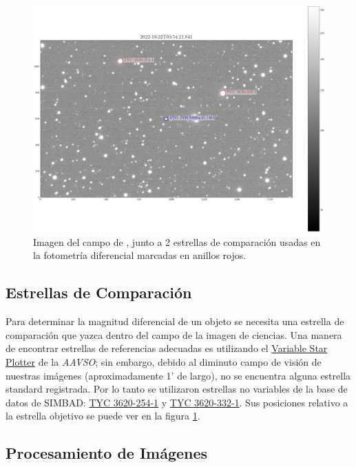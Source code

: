 \begin{figure}[!ht]
	\centering
	\includegraphics[scale=0.4]{Observaciones/Secciones/Figures/10-22 Sample Image.png}
	\caption{Imagen del campo de \atoObjIdNoSpace, junto a 2 estrellas de comparación usadas en la fotometría diferencial marcadas en anillos rojos.}
	\label{ccdImageField}
\end{figure}

\subsection{Estrellas de Comparación}

Para determinar la magnitud diferencial de un objeto se necesita una estrella de
comparación que yazca dentro del campo de la imagen de ciencias. Una manera de
encontrar estrellas de referencias adecuadas es utilizando el
\href{https://app.aavso.org/vsp/}{Variable Star Plotter} de la \textit{AAVSO};
sin embargo, debido al diminuto campo de visión de nuestras imágenes
(aproximadamente 1' de largo), no se encuentra alguna estrella standard
registrada. Por lo tanto se utilizaron estrellas no variables de la base de
datos de SIMBAD:
\href{http://simbad.cds.unistra.fr/simbad/sim-id?Ident=%406898031&Name=TYC%203620-254-1&submit=submit}{TYC
3620-254-1} y
\href{http://simbad.cds.unistra.fr/simbad/sim-id?Ident=%406898038&Name=TYC%203620-332-1&submit=submit}{TYC
3620-332-1}. Sus posiciones relativo a la estrella objetivo \atoObjId se puede
ver en la figura \ref{ccdImageField}.

\subsection{Procesamiento de Imágenes}

